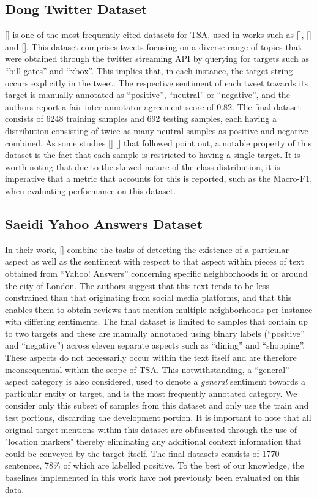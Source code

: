 \documentclass[12pt, a4paper]{report}
\theoremstyle{definition}
\theoremstyle{definition}%
\theoremstyle{definition}%
\theoremstyle{definition}%
\theoremstyle{definition}%
\theoremstyle{definition}%
\renewcommand{\cite}[1]{[\citealp{#1}]}
\begin{document}
\subsection{Dong Twitter Dataset}
\cite{dong} is one of the most frequently cited datasets for TSA, used in works such as \cite{tang2016b}, \cite{chen2017} and \cite{zheng2018}. This dataset comprises tweets focusing on a diverse range of topics that were obtained through the twitter streaming API by querying for targets such as \enquote{bill gates} and \enquote{xbox}. This implies that, in each instance, the target string occurs explicitly in the tweet. The respective sentiment of each tweet towards its target is manually annotated as \enquote{positive}, \enquote{neutral} or \enquote{negative}, and the authors report a fair inter-annotator agreement score of $0.82$.  The final dataset consists of 6248 training samples and 692 testing samples, each having a distribution consisting of twice as many neutral samples as positive and negative combined. As some studies \cite{wang2017} \cite{saeidi2016} that followed point out, a notable property of this dataset is the fact that each sample is restricted to having a single target. It is worth noting that due to the skewed nature of the class distribution, it is imperative that a metric that accounts for this is reported, such as the Macro-F1, when evaluating performance on this dataset.

\subsection{Saeidi Yahoo Answers Dataset}
In their work, \cite{saeidi2016} combine the tasks of detecting the existence of a particular aspect as well as the sentiment with respect to that aspect within pieces of text obtained from \enquote{Yahoo! Answers} concerning specific neighborhoods in or around the city of London. The authors suggest that this text tends to be less constrained than that originating from social media platforms, and that this enables them to obtain reviews that mention multiple neighborhoods per instance with differing sentiments. The final dataset is limited to samples that contain up to two targets and these are manually annotated using binary labels (\enquote{positive} and \enquote{negative}) across eleven separate aspects such as \enquote{dining} and \enquote{shopping}. These aspects do not necessarily occur within the text itself and are therefore inconsequential within the scope of TSA. This notwithstanding, a \enquote{general} aspect category is also considered, used to denote a \textit{general} sentiment towards a particular entity or target, and is the most frequently annotated category. We consider only this subset of samples from this dataset and only use the train and test portions, discarding the development portion. It is important to note that all original target mentions within this dataset are obfuscated through the use of "location markers" thereby eliminating any additional context information that could be conveyed by the target itself. The final datasets consists of 1770 sentences, 78\% of which are labelled positive. To the best of our knowledge, the baselines implemented in this work have not previously been evaluated on this data.
\end{document}
